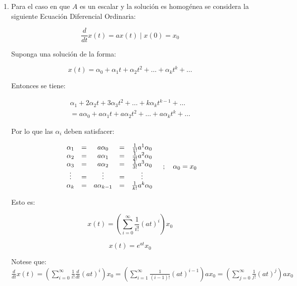 \begin{enumerate}

\item
Para el caso en que $A$ es un escalar y la solución es homogénea se considera la siguiente Ecuación Diferencial Ordinaria:

\begin{equation}
\frac{d}{dt} x(t) = a x(t) \mid x(0) = x_0
\end{equation}

Suponga una solución de la forma:

\begin{equation}
x(t) = \alpha_0 + \alpha_1 t + \alpha_2 t^2 + \dots + \alpha_k t^k + \dots
\end{equation}

Entonces se tiene:

\begin{multline}
\alpha_1 + 2 \alpha_2 t + 3 \alpha_3 t^2 + \dots + k \alpha_k t^{k-1} + \dots \\ = a \alpha_0 + a \alpha_1 t + a \alpha_2 t^2 + \dots + a \alpha_k t^k + \dots \nonumber
\end{multline}

Por lo que las $\alpha_i$ deben satisfacer:

\begin{equation}
\begin{array}{c c c c c}
\alpha_1 & = & a \alpha_0     & = & \frac{1}{1!} a^1 \alpha_0 \\
\alpha_2 & = & a \alpha_1     & = & \frac{1}{2!} a^2 \alpha_0 \\
\alpha_3 & = & a \alpha_2     & = & \frac{1}{3!} a^3 \alpha_0 \\
\vdots   & = & \vdots         & = & \vdots                    \\
\alpha_k & = & a \alpha_{k-1} & = & \frac{1}{k!} a^k \alpha_0 \\
\end{array} \quad ; \quad \alpha_0 = x_0
\end{equation}

Esto es:

\begin{equation}
x(t) = \left( \sum\limits_{i = 0}^{\infty} \frac{1}{i!} (a t)^i \right) x_0 \nonumber
\end{equation}

\begin{equation}
x(t) = e^{at} x_0
\end{equation}

Notese que: $\frac{d}{dt} x(t) = \left( \sum\limits_{i=0}^{\infty} \frac{1}{i!} \frac{d}{dt} (at)^i \right) x_0 = \left( \sum\limits_{i=1}^{\infty} \frac{1}{(i-1)!} (at)^{i-1} \right) a x_0 = \left( \sum\limits_{j=0}^{\infty} \frac{1}{j!} (at)^j \right) a x_0$


\end{enumerate}
